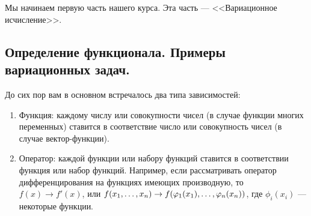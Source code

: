 \chapter{}
\label{lecture1}
Мы начинаем первую часть нашего курса. Эта часть --- <<Вариационное исчисление>>.
\section{Определение функционала. Примеры вариационных задач.}
\label{lecture1section1}
До сих пор вам в основном встречалось два типа зависимостей:
\begin{enumerate}
	\item Функция: каждому числу или совокупности чисел (в случае функции многих переменных) ставится в соответствие число или совокупность чисел (в случае вектор-функции).
	
	\item Оператор: каждой функции или набору функций ставится в соответствии функция или набор функций. Например, если рассматривать оператор дифференцирования на функциях имеющих производную, то $f(x)\to f'(x)$, или $f(x_1,\ldots,x_n)\?\to f(\phi_1(x_1),\ldots,\phi_n(x_n))$, где $\phi_i(x_i)$ --- некоторые функции.
	
\end{enumerate}

